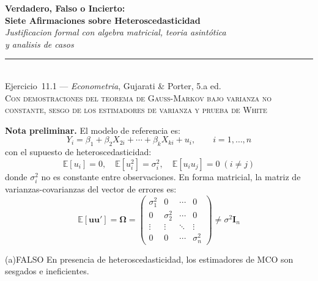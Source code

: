 \documentclass[12pt, letterpaper]{article}
\theoremstyle{remark}
\newcommand{\E}{\mathbb{E}}
\begin{document}
\begin{center}
  {\LARGE\bfseries Verdadero, Falso o Incierto:}\\[6pt]
  {\LARGE\bfseries Siete Afirmaciones sobre Heteroscedasticidad}\\[12pt]
  {\large\itshape Justificacion formal con algebra matricial, teoria asintótica}\\
  {\large\itshape y analisis de casos}\\[14pt]
  \rule{0.55\linewidth}{0.6pt}\\[8pt]
  {\normalsize Ejercicio~11.1 --- \textit{Econometria}, Gujarati \& Porter, 5.a ed.}\\[4pt]
  {\small\textsc{Con demostraciones del teorema de Gauss-Markov bajo varianza no constante,
  sesgo de los estimadores de varianza y prueba de White}}
\end{center}

\vspace{10pt}

\noindent\textbf{Nota preliminar.}\quad
El modelo de referencia es:
\begin{equation}
  Y_i = \beta_1 + \beta_2 X_{2i} + \cdots + \beta_k X_{ki} + u_i,
  \qquad i = 1, \ldots, n
  \label{eq:modelo}
\end{equation}
con el supuesto de heteroscedasticidad:
\begin{equation}
  \E[u_i] = 0, \quad \E[u_i^2] = \sigma_i^2, \quad \E[u_i u_j] = 0 \; (i \neq j)
  \label{eq:heterosc}
\end{equation}
donde $\sigma_i^2$ no es constante entre observaciones. En forma matricial,
la matriz de varianzas-covarianzas del vector de errores es:
\begin{equation}
  \E[\mathbf{u}\mathbf{u}'] = \boldsymbol\Omega =
  \begin{pmatrix}
    \sigma_1^2 & 0 & \cdots & 0\\
    0 & \sigma_2^2 & \cdots & 0\\
    \vdots & \vdots & \ddots & \vdots\\
    0 & 0 & \cdots & \sigma_n^2
  \end{pmatrix}
  \neq \sigma^2 \mathbf{I}_n
  \label{eq:Omega}
\end{equation}

\bigskip

\begin{verdict}{(a)}{FALSO}
  En presencia de heteroscedasticidad, los estimadores de MCO son sesgados e
  ineficientes.
\end{verdict}
\end{document}
